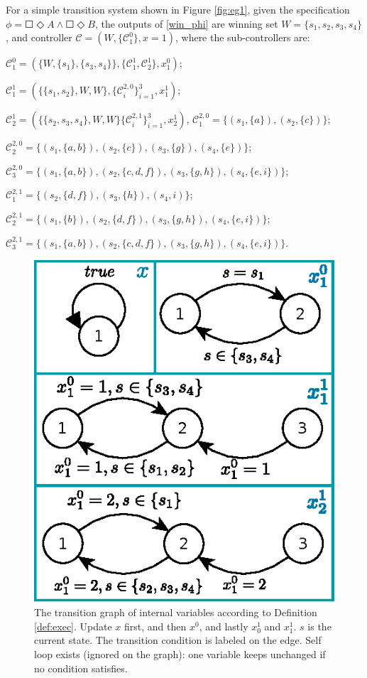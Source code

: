 \begin{example}
	For a simple transition system shown in Figure \ref{fig:eg1}, given the specification $ \phi = \Square \Diamond A \wedge \Square \Diamond B $, the outputs of \eqref{win_phi} are winning set $ W= \{s_1,s_2,s_3,s_4\}$, and controller $ \mathcal{C} = (W,\{\mathcal{C}^0_1\}, x = 1) $, where the sub-controllers are:
	
	$ \mathcal{C}^0_1 = (\{W,\{s_1\},\{s_3,s_4\}\},\{\mathcal{C}^1_1, \mathcal{C}^1_2\}, x^0_1 ) $; 
	
	$ \mathcal{C}^1_1 = (\{\{s_1,s_2\},W,W \},\{\mathcal{C}^{2,0}_i\}_{i=1}^3,x^1_1)$;
	
	$ \mathcal{C}^1_2 = (\{\{s_2,s_3,s_4\},W,W \}\{\mathcal{C}^{2,1}_i\}_{i=1}^{3},x^1_2 )$, $ \mathcal{C}^{2,0}_1 = \{(s_1,\{a\}),(s_2,\{c\})\} $;
	
	$ \mathcal{C}^{2,0}_2 = \{(s_1,\{a,b\}),(s_2,\{c\}),(s_3,\{g\}),(s_4,\{e\})\} $;
	
	$ \mathcal{C}^{2,0}_3 = \{(s_1,\{a,b\}),(s_2,\{c,d,f\}),(s_3,\{g,h\}),(s_4,\{e,i\})\} $; 
	
	$ \mathcal{C}^{2,1}_1 = \{(s_2,\{d,f\}),(s_3,\{h\}),(s_4,i)\} $; 
	
	$ \mathcal{C}^{2,1}_2 = \{(s_1,\{b\}),(s_2,\{d,f\}), (s_3,\{g,h\}), (s_4,\{e,i\})\} $;
	
	$ \mathcal{C}^{2,1}_3 = \{(s_1,\{a,b\}),(s_2,\{c,d,f\}),(s_3,\{g,h\}),(s_4,\{e,i\})\} $.
	
	\begin{figure}
		\centering
		\includegraphics[width=0.7\linewidth]{pic/xupdate}
		\caption{ The transition graph of internal variables according to Definition \ref{def:exec}. Update $ x$ first, and then $ x^0 $, and lastly $ x_0^1 $ and $x^1_1 $. $ s $ is the current state. The transition condition is labeled on the edge. Self loop exists (ignored on the graph): one variable keeps unchanged if no condition satisfies.}
		\label{fig:xupdate}
	\end{figure}
	

\end{example}
